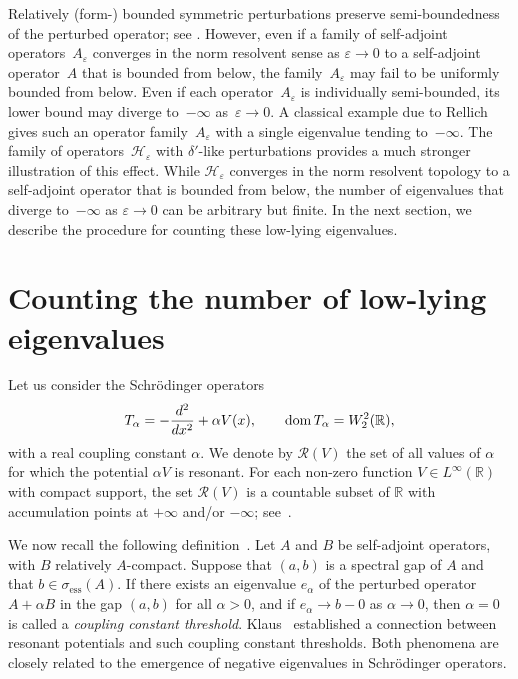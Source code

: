 \documentclass[reqno]{amsart}
\theoremstyle{definition}
\theoremstyle{remark}
\numberwithin{equation}{section}
\newcommand{\dmn}{\mathop{\rm dom}}
\newcommand{\Real}{\mathbb R}
\newcommand{\eps}{\varepsilon}
\newcommand{\cH}{\mathcal{H}}
\begin{document}
Relatively (form-) bounded symmetric perturbations preserve semi-boun\-ded\-ness of the perturbed operator; see \cite[Th.~IV.4.11, Th.~VI.1.38]{Kato}. However, even if a family of self-adjoint operators~$A_\eps$ converges in the norm resolvent sense as $\eps\to0$ to a self-adjoint operator~$A$ that is bounded from below, the family~$A_\eps$ may fail to be uniformly bounded from below. Even if each operator~$A_\eps$ is individually semi-bounded, its lower bound may diverge to~$-\infty$ as~$\eps \to 0$. A classical example due to Rellich~\cite[Ex.~IV.4.14]{Kato} gives such an operator family~$A_\eps$ with a single eigenvalue tending to~$-\infty$. The family of operators~$\cH_\eps$ with $\delta'$-like perturbations provides a much stronger illustration of this effect. While $\cH_\eps$ converges in the norm resolvent topology to a self-adjoint operator that is bounded from below, the number of eigenvalues that diverge to~$-\infty$ as $\eps \to 0$ can be arbitrary but finite. In the next section, we describe the procedure for counting these low-lying eigenvalues.


%
\section{Counting the number of low-lying eigenvalues}\label{sec:counting}
%

Let us consider the Schrödinger operators
\begin{equation}\label{Talpha}
    T_\alpha = -\frac{d^2}{dx^2} + \alpha V(x), \qquad \dmn T_\alpha = W^2_2(\Real),
\end{equation}
with a real coupling constant $\alpha$. We denote by $\mathcal{R}(V)$ the set of all values of $\alpha$ for which the potential $\alpha V$ is resonant. For each non-zero function $V \in L^\infty(\Real)$ with compact support, the set $\mathcal{R}(V)$ is a countable subset of $\Real$ with accumulation points at $+\infty$ and/or $-\infty$; see~\cite{GolovatyFrontiers2019}.

We now recall the following definition~\cite{Klaus1982}. Let $A$ and $B$ be self-adjoint operators, with $B$ relatively $A$-compact. Suppose that $(a,b)$ is a spectral gap of $A$ and that $b \in \sigma_{\text{ess}}(A)$. If there exists an eigenvalue $e_\alpha$ of the perturbed operator $A + \alpha B$ in the gap $(a,b)$ for all $\alpha > 0$, and if $e_\alpha \to b-0$ as $\alpha \to 0$, then $\alpha = 0$ is called a \emph{coupling constant threshold}. Klaus~\cite{Klaus1982} established a connection between resonant potentials and such coupling constant thresholds. Both phenomena are closely related to the emergence of negative eigenvalues in Schrödinger operators.
\end{document}
